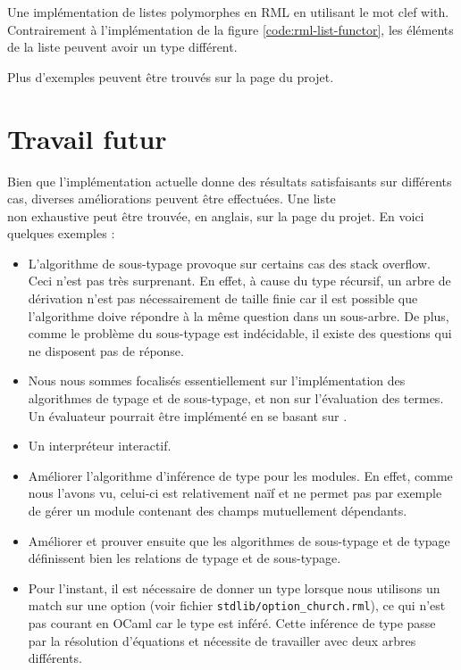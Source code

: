 \begin{listing}
  \inputminted{OCaml}{codes/list.rml}
  \caption{Une implémentation de listes polymorphes en RML en utilisant le mot
    clef with. Contrairement à l'implémentation de la figure
    \ref{code:rml-list-functor}, les éléments de la liste peuvent avoir un type
  différent.}
  \label{code:rml-list-with}
\end{listing}

Plus d'exemples peuvent être trouvés sur la page du projet.

\section{Travail futur}

Bien que l'implémentation actuelle donne des résultats satisfaisants sur
différents cas, diverses améliorations peuvent être effectuées. Une liste \\
non exhaustive peut être trouvée, en anglais, sur la page du
projet\cite{rml-github-issues}. En voici quelques exemples :

\begin{itemize}
  \item L'algorithme de sous-typage provoque sur certains cas des stack
    overflow. Ceci n'est pas très surprenant. En effet, à cause
    du type récursif, un arbre de dérivation n'est pas nécessairement de taille finie car
    il est possible que l'algorithme doive répondre à la même question dans un
    sous-arbre. De plus, comme le problème du sous-typage est indécidable, il
    existe des questions qui ne disposent pas de réponse.
  \item Nous nous sommes focalisés essentiellement sur l'implémentation des
    algorithmes de typage et de sous-typage, et non sur l'évaluation des termes.
    Un évaluateur pourrait être implémenté en se basant sur \cite{WF-DOT-2016}.
  \item Un interpréteur interactif.
  \item Améliorer l'algorithme d'inférence de type pour les modules. En effet,
      comme nous l'avons vu, celui-ci est relativement naïf et ne permet pas par
      exemple de gérer un module contenant des champs mutuellement dépendants.
  \item Améliorer et prouver ensuite que les algorithmes de sous-typage et de
      typage définissent bien les relations de typage et de sous-typage.
  \item Pour l'instant, il est nécessaire de donner un type lorsque nous
    utilisons un match sur une option (voir fichier \verb|stdlib/option_church.rml|), ce qui
    n'est pas courant en OCaml car le type est inféré. Cette inférence de type
    passe par la résolution d'équations et nécessite de travailler avec deux
    arbres différents.
\end{itemize}

